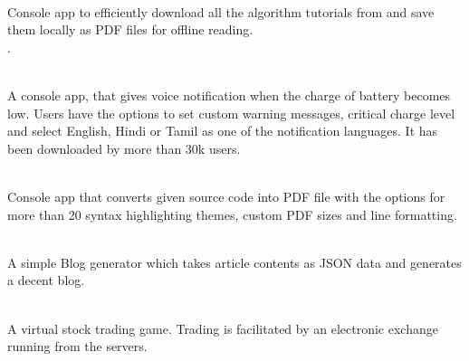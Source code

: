 \documentclass[]{deedy-resume-openfont}
\begin{document}
\begin{minipage}[t]{0.66\textwidth}
\\
Console app to efficiently download all the algorithm tutorials from  and save them locally as PDF files for offline reading.\\ \textbf{\href{https://github.com/tushar-rishav/topcoder-dl}{}}.\\ \textbf{\href{https://github.com/tushar-rishav/g4g-dl}{}}
\sectionsep 

\\
A console app, that gives voice notification when the charge of battery becomes low. Users have the options to set custom warning messages, critical charge level and select English, Hindi or Tamil as one of the notification languages. It has been downloaded by more than 30k users. \textbf{\href{https://github.com/tushar-rishav/balert}{}}
\sectionsep

\\
Console app that converts given source code into PDF file with the options for more than 20 syntax highlighting themes, custom PDF sizes and line formatting. \textbf{\href{https://github.com/tushar-rishav/code2pdf}{}}
\sectionsep

\\
A simple Blog generator which takes article contents as JSON data and generates a decent blog.
\textbf{\href{https://github.com/tushar-rishav/Blogular}{}}
\sectionsep

\\
A virtual stock trading game. Trading is facilitated by an electronic exchange running from the servers.
\textbf{\href{https://github.com/delta/DalalStreet}{}}
\sectionsep


\end{minipage} 
\end{document}
